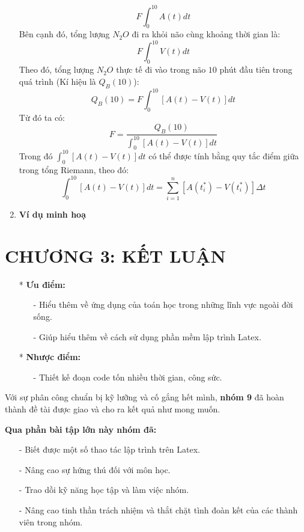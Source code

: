 \documentclass[12pt,a4paper]{article}
\begin{document}
\begin{enumerate}[a/]
\begin{flushleft}
		      $$F \int_{0}^{10} A(t)dt$$
		      Bên cạnh đó, tổng lượng $N_2O$ đi ra khỏi não cùng khoảng thời gian là:
		      $$F \int_{0}^{10} V(t)dt$$
		      Theo đó, tổng lượng $N_2O$ thực tế đi vào trong não $10$ phút đầu tiên trong quá trình (Kí hiệu là $Q_B(10)$):
		      $$Q_B(10)=F\int_{0}^{10}\left[A(t)-V(t)\right]dt$$
		      Từ đó ta có:
		      $$F=\frac{Q_B(10)}{\displaystyle \int_{0}^{10}\left[A(t) - V(t)\right]dt}$$
		      Trong đó $\displaystyle \int_{0}^{10}\left[A(t) - V(t)\right]dt$ có thể được tính bằng quy tắc điểm giữa trong tổng Riemann, theo đó:
		      $$\displaystyle \int_{0}^{10}\left[A(t) - V(t)\right]dt = \sum_{i = 1}^{n} \left[A(t_i^*)-V(t_i^*)\right] \Delta t$$
	      \end{flushleft}
	\item \textbf{Ví dụ minh hoạ}
\end{enumerate}

\newpage
{}
\section*{CHƯƠNG 3: KẾT LUẬN}
\begin{itemize}
	\item[*] \textbf{Ưu điểm:}
	      \begin{itemize}
		      \item[-] Hiểu thêm về ứng dụng của toán học trong những lĩnh vực ngoài đời sống.
		      \item[-] Giúp hiểu thêm về cách sử dụng phần mềm lập trình Latex.
	      \end{itemize}
	\item[*] \textbf{Nhược điểm:}
	      \begin{itemize}
		      \item[-] Thiết kế đoạn code tốn nhiều thời gian, công sức.
	      \end{itemize}
\end{itemize}

\vspace{2em}
Với sự phân công chuẩn bị kỹ lưỡng và cố gắng hết mình, \textbf{nhóm 9} đã hoàn thành đề tài được giao và cho ra kết quả như mong muốn.

\vspace{2em}
\textbf{Qua phần bài tập lớn này nhóm đã:}
\begin{itemize}
	\item[-] Biết được một số thao tác lập trình trên Latex.
	\item[-] Nâng cao sự hứng thú đối với môn học.
	\item[-] Trao dồi kỹ năng học tập và làm việc nhóm.
	\item[-] Nâng cao tinh thần trách nhiệm và thắt chặt tình đoàn kết của các thành viên trong nhóm.
\end{itemize}
\end{document}
